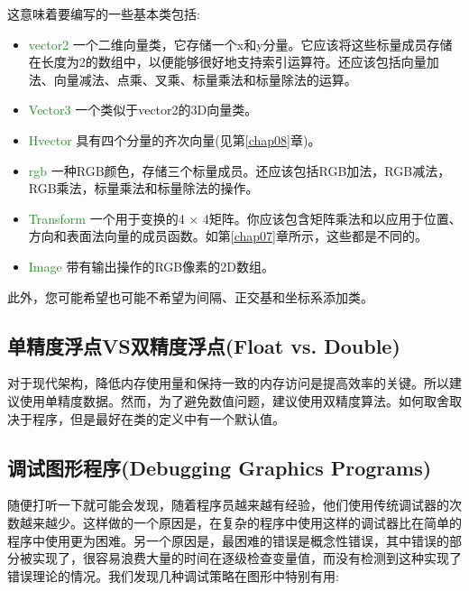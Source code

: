 这意味着要编写的一些基本类包括:

\begin{itemize}
	\item  \textcolor{ForestGreen}{vector2} 一个二维向量类，它存储一个x和y分量。它应该将这些标量成员存储在长度为2的数组中，以便能够很好地支持索引运算符。还应该包括向量加法、向量减法、点乘、叉乘、标量乘法和标量除法的运算。
	
	\item  \textcolor{ForestGreen}{Vector3} 一个类似于vector2的3D向量类。
	
	\item  \textcolor{ForestGreen}{Hvector} 具有四个分量的齐次向量(见第\ref{chap08}章)。
	
	\item  \textcolor{ForestGreen}{rgb} 一种RGB颜色，存储三个标量成员。还应该包括RGB加法，RGB减法，RGB乘法，标量乘法和标量除法的操作。
	
	\item  \textcolor{ForestGreen}{Transform} 一个用于变换的4 × 4矩阵。你应该包含矩阵乘法和以应用于位置、方向和表面法向量的成员函数。如第\ref{chap07}章所示，这些都是不同的。
	
	\item  \textcolor{ForestGreen}{Image} 带有输出操作的RGB像素的2D数组。
\end{itemize}

此外，您可能希望也可能不希望为间隔、正交基和坐标系添加类。

\subsection{单精度浮点VS双精度浮点(Float vs. Double)} 

对于现代架构，降低内存使用量和保持一致的内存访问是提高效率的关键。所以建议使用单精度数据。然而，为了避免数值问题，建议使用双精度算法。如何取舍取决于程序，但是最好在类的定义中有一个默认值。

\subsection{调试图形程序(Debugging Graphics Programs)} 

随便打听一下就可能会发现，随着程序员越来越有经验，他们使用传统调试器的次数越来越少。这样做的一个原因是，在复杂的程序中使用这样的调试器比在简单的程序中使用更为困难。另一个原因是，最困难的错误是概念性错误，其中错误的部分被实现了，很容易浪费大量的时间在逐级检查变量值，而没有检测到这种实现了错误理论的情况。我们发现几种调试策略在图形中特别有用:

